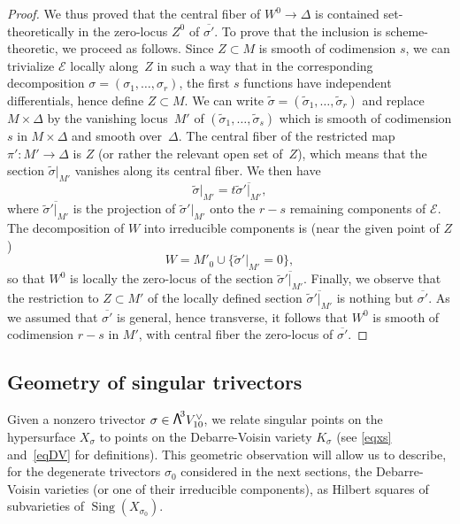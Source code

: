 \documentclass[JEP,XML,SOM,Unicode, NoEqCountersInSection,NoFloatCountersInSection]{cedram}
\let\mathcal\mathscr
\theoremstyle{definition}
\newcommand\cE{\mathcal{E}}
\DeclareMathOperator{\Sing}{Sing}\let\sing\Sing
\newcommand\bw[1]{{\hbox{\large$\mathsf{\Lambda}$}^{\!#1}}}
\begin{document}
\begin{proof}
We thus proved that
the central fiber of $W^0\to \Delta$ is contained set-theoretically in the zero-locus $Z^0$ of $\overline {\sigma'} $. To prove that the inclusion is scheme-theoretic, we proceed as follows.
Since $Z\subset M$ is smooth of codimension $s$, we can trivialize $\cE$ locally along~$Z$ in such a way
that in the corresponding decomposition $\sigma=(\sigma_1,\ldots,\sigma_r)$, the first $s$ functions have independent differentials, hence define $Z\subset M$. We can write
$\widetilde\sigma=(\widetilde\sigma_1,\ldots,\widetilde\sigma_r)$ and replace $M\times \Delta$ by the vanishing locus~$M'$ of
$(\widetilde\sigma_1,\ldots,\widetilde\sigma_s)$ which is smooth of codimension $s$ in $M\times \Delta$ and smooth
over~$\Delta$. The central fiber of the restricted map $\pi'\colon M'\to \Delta$ is $Z$ (or rather the relevant open set of~$Z$),
which means that the section $\widetilde\sigma\vert_{ M'}$ vanishes along its central fiber. We then have
\begin{equation}\label{eqpourMprime}
\widetilde\sigma\vert_{ M'}=t\overline{\widetilde\sigma'\vert_{ M'}},
\end{equation}
where $\overline{\widetilde\sigma'\vert_{ M'}}$ is the projection of $\widetilde\sigma'\vert_{ M'}$ onto the
$r-s$ remaining components of $\cE$.
The decomposition of $W$ into irreducible components is (near the given point of $Z$)
\[
W=M'_0\cup \{\widetilde\sigma'\vert_{ M'}=0\},
\]
so that $W^0$ is locally the zero-locus of the section $\overline{\widetilde\sigma'\vert_{ M'}}$. Finally, we observe that the restriction to $Z\subset M'$ of the locally defined section
$\overline{\widetilde\sigma'\vert_{ M'}}$ is nothing but $\overline { \sigma'} $. As we assumed that
$\overline { \sigma'} $ is general, hence transverse, it follows that
$W^0$ is smooth of codimension $r-s$ in $M'$, with central fiber the zero-locus of $\overline { \sigma'} $.
\end{proof}

\subsection{Geometry of singular trivectors}

Given a nonzero trivector $\sigma\in \bw3V_{10}^\vee$, we relate singular points on the hypersurface $X_\sigma$ to points on the Debarre-Voisin variety $K_\sigma$ (see \eqref{eqxs} and~\eqref{eqDV} for definitions). This geometric observation will allow us to describe, for the degenerate trivectors $\sigma_0$ considered in the next sections, the Debarre-Voisin varieties
(or one of their irreducible components), as
Hilbert squares of subvarieties of $\Sing(X_{\sigma_0})$.
\end{document}
